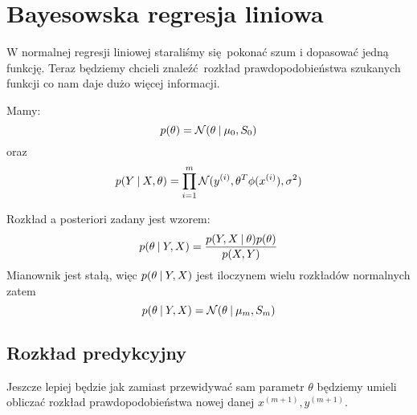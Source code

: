 \section{Bayesowska regresja liniowa}

W normalnej regresji liniowej staraliśmy się pokonać szum i dopasować jedną funkcję.
Teraz będziemy chcieli znaleźć rozkład prawdopodobieństwa szukanych funkcji co nam daje dużo więcej informacji.

Mamy:
\[
    p(\theta) = \operatorname{\mathcal{N}}(\theta \:\vert\: \mu_0, S_0)
\]
oraz
\[
    p(Y \:\vert\: X, \theta) = \prod_{i=1}^m \operatorname{\mathcal{N}}(y^{(i)}, \theta^T\phi(x^{(i)}), \sigma^2)
\]

Rozkład a posteriori zadany jest wzorem:
\[
    p(\theta \:\vert\: Y, X) = \frac{p(Y, X \:\vert\: \theta)p(\theta)}{p(X, Y)}
\]
Mianownik jest stałą, więc \( p(\theta \:\vert\: Y, X) \) jest iloczynem wielu rozkładów normalnych zatem
\[
    p(\theta \:\vert\: Y, X) = \operatorname{\mathcal{N}}(\theta \:\vert\: \mu_m, S_m)
\]

\subsection{Rozkład predykcyjny}

Jeszcze lepiej będzie jak zamiast przewidywać sam parametr \( \theta \) będziemy umieli obliczać rozkład prawdopodobieństwa nowej danej \( x^{(m+1)}, y^{(m+1)} \).